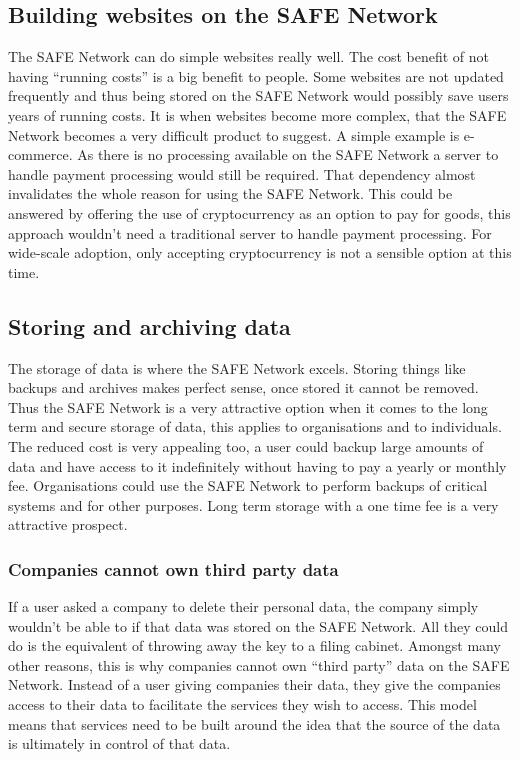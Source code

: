 \subsection{Building websites on the SAFE Network}

The SAFE Network can do simple websites really well. The cost benefit of not having ``running costs'' is a big benefit to people. Some websites are not updated frequently and thus being stored on the SAFE Network would possibly save users years of running costs. It is when websites become more complex, that the SAFE Network becomes a very difficult product to suggest. A simple example is e-commerce. As there is no processing available on the SAFE Network a server to handle payment processing would still be required. That dependency almost invalidates the whole reason for using the SAFE Network. This could be answered by offering the use of cryptocurrency as an option to pay for goods, this approach wouldn't need a traditional server to handle payment processing. For wide-scale adoption, only accepting cryptocurrency is not a sensible option at this time.

\subsection{Storing and archiving data}

The storage of data is where the SAFE Network excels. Storing things like backups and archives makes perfect sense, once stored it cannot be removed. Thus the SAFE Network is a very attractive option when it comes to the long term and secure storage of data, this applies to organisations and to individuals. The reduced cost is very appealing too, a user could backup large amounts of data and have access to it indefinitely without having to pay a yearly or monthly fee. Organisations could use the SAFE Network to perform backups of critical systems and for other purposes. Long term storage with a one time fee is a very attractive prospect.

\subsubsection{Companies cannot own third party data}

If a user asked a company to delete their personal data, the company simply wouldn't be able to if that data was stored on the SAFE Network. All they could do is the equivalent of throwing away the key to a filing cabinet. Amongst many other reasons, this is why companies cannot own ``third party'' data on the SAFE Network. Instead of a user giving companies their data, they give the companies access to their data to facilitate the services they wish to access. This model means that services need to be built around the idea that the source of the data is ultimately in control of that data.

